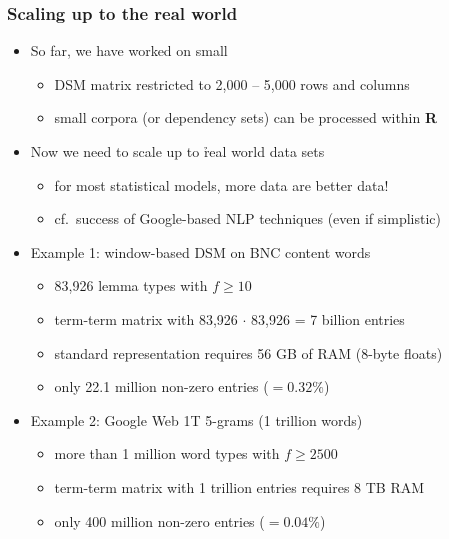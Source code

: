 \documentclass[t]{beamer} %
\begin{document}
\begin{frame}
  \frametitle{Scaling up to the real world}

  \begin{itemize}
  \item So far, we have worked on small 
    \begin{itemize}
    \item DSM matrix restricted to 2,000 -- 5,000 rows and columns
    \item small corpora (or dependency sets) can be processed within
      \textbf{R}
    \end{itemize}
    \pause
  \item Now we need to scale up to \h{real world} data sets
    \begin{itemize}
    \item for most statistical models, more data are better data!
    \item cf.\ success of Google-based NLP techniques (even if simplistic)
    \end{itemize}
    \pause
  \item Example 1: window-based DSM on BNC content words
    \begin{itemize}
    \item 83,926 lemma types with $f\geq 10$
    \item term-term matrix with 83,926 $\cdot$ 83,926 = 7 billion entries
    \item standard representation requires 56 GB of RAM (8-byte floats)%
      \pause
    \item only 22.1 million non-zero entries ($= 0.32\%$)
    \end{itemize}
    \pause
  \item Example 2: Google Web 1T 5-grams (1 trillion words)
    \begin{itemize}
    \item more than 1 million word types with $f\geq 2500$
    \item term-term matrix with 1 trillion entries requires 8 TB RAM
    \item only 400 million non-zero entries ($= 0.04\%$)
    \end{itemize}
  \end{itemize}
\end{frame}
\end{document}
